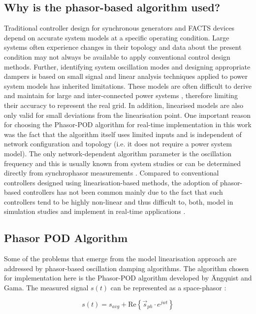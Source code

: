 \documentclass{ieeeaccess}
\begin{document}
\subsection{Why is the phasor-based algorithm used?} 
Traditional controller design for synchronous generators and FACTS devices depend on accurate system models at a specific operating condition. Large systems often experience changes in their topology and data about the present condition may not always be available to apply conventional control design methods. Further, identifying system oscillation modes and designing appropriate dampers is based on small signal and linear analysis techniques applied to power system models has inherited limitations. These models are often difficult to derive and maintain for large and inter-connected power systems \cite{WAMTCSC}, therefore limiting their accuracy to represent the real grid. In addition, linearised models are also only valid for small deviations from the linearisation point. One important reason for choosing the Phasor-POD algorithm for real-time implementation in this work was the fact that the algorithm itself uses limited inputs and is independent of network configuration and topology (i.e. it does not require a power system model). The only network-dependent algorithm parameter is the oscillation frequency and this is usually known from system studies or can be determined directly from synchrophasor measurements \cite{TaskForce}. Compared to conventional controllers designed using linearisation-based methods, the adoption of phasor-based controllers has not been common mainly due to the fact that such controllers tend to be highly non-linear and thus difficult to, both, model in simulation studies \cite{Chaudhuri} and implement in real-time applications \cite{WAPODNorway}.

\subsection{Phasor POD Algorithm}

Some of the problems that emerge from the model linearisation approach are addressed by phasor-based oscillation damping algorithms. The algorithm chosen for implementation here is the Phasor-POD algorithm developed by \"{A}ngquist and Gama\cite{PhasorPOD}. The measured signal $s(t)$ can be represented as a space-phasor \cite{Chaudhuri}: 

\begin{equation}
s(t)={s}_{avg}+\mathrm{Re}\left\{{\stackrel{\to }{s}}_{ph}\cdot {e}^{{jwt}}\right\}
\end{equation}
\end{document}

